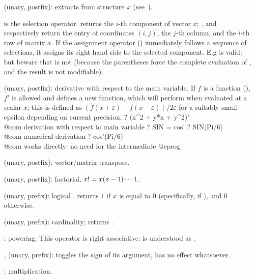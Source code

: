 %
 (unary, postfix):  extracts
 from structure $x$ (see~).

\kbd{[ ]} is the selection operator.  returns the $i$-th
component of vector $x$; ,  and
 respectively return the entry of coordinates $(i,j)$, the
$j$-th column, and the $i$-th row of matrix $x$. If the assignment operator
(\kbd{=}) immediately follows a sequence of selections, it assigns its right
hand side to the selected component. E.g  is valid; but
beware that  is not (because the parentheses force the
complete evaluation of , and the result is not modifiable).

%
 (unary, postfix): derivative with respect to the main variable.
If $f$ is a function (), $f'$ is allowed and defines a new
function, which will perform  when evaluated
at a scalar $x$; this is defined as $(f(x+\varepsilon) - f(x-\varepsilon)) /
2\varepsilon$ for a suitably small epsilon depending on current precision.
\bprog
? (x^2 + y*x + y^2)'  \\@com derivation with respect to main variable 
? SIN = cos'
? SIN(Pi/6)         \\@com numerical derivation
? cos'(Pi/6)        \\@com works directly: no need for the intermediate 
@eprog

\strut\kbd{\til} (unary, postfix): vector/matrix transpose.

\kbd{!} (unary, postfix): factorial. $x{\tt !}=x(x-1)\cdots 1$.

\kbd{!} (unary, prefix): logical .  returns $1$ if $x$ is
equal to $0$ (specifically, if ), and $0$ otherwise.

%
\kbd{\#} (unary, prefix): cardinality;  returns .

%
\kbd{\pow}: powering. This operator is right associative:
 is understood as .

%
\kbd{+}, \kbd{-} (unary, prefix): \kbd{-} toggles the sign of its argument,
\kbd{+} has no effect whatsoever.

%
\kbd{*}: multiplication.


